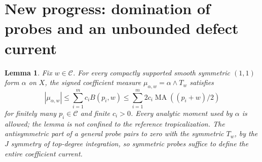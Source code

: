 \documentclass[11pt]{article}
\newtheorem{lemma}[theorem]{Lemma}
\newcommand{\C}{\mathcal C}
\newcommand{\MA}{\operatorname{MA}}
\begin{document}
\section{New progress: domination of probes and an unbounded defect current}
\begin{lemma}\label{dom}
Fix $w\in\C$. For every compactly supported smooth symmetric $(1,1)$ form
$\alpha$ on $X$, the signed coefficient measure
$\mu_{\alpha,w}=\alpha\wedge T_w$ satisfies
\[
 |\mu_{\alpha,w}|\le\sum_{i=1}^m c_i B(p_i,w)
 \le\sum_{i=1}^m2c_i\MA((p_i+w)/2)                         \tag{14}
\]
for finitely many $p_i\in\C$ and finite $c_i>0$.
Every analytic moment used by $\alpha$ is allowed; the lemma is not confined
to the reference tropicalization. The antisymmetric part of a general probe
pairs to zero with the symmetric $T_w$, by the $J$ symmetry of top-degree
integration, so symmetric probes suffice to define the entire coefficient
current.
\end{lemma}
\end{document}
